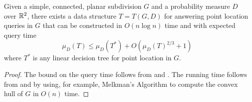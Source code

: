 \documentclass[charterfonts,lotsofwhite]{patmorin}
\begin{document}
\begin{thm}
Given a simple, connected, planar subdivision $G$ and a probability
measure $D$ over $\mathbb{R}^2$, there exists a data structure $T=T(G,D)$ for
answering point location queries in $G$ that can be
constructed in $O(n\log n)$ time and with expected query time
\[
   \mu_D(T) \le \mu_D(T^*) + O(\mu_D(T)^{2/3} + 1)
\]
where $T^*$ is any linear decision tree for point location in $G$.
\end{thm} 

\begin{proof}
The bound on the query time follows from  and
. The running time follows from
 and by using, for
example, Melkman's
Algorithm to compute the convex hull of $G$ in $O(n)$ time.
\end{proof}



\end{document}

